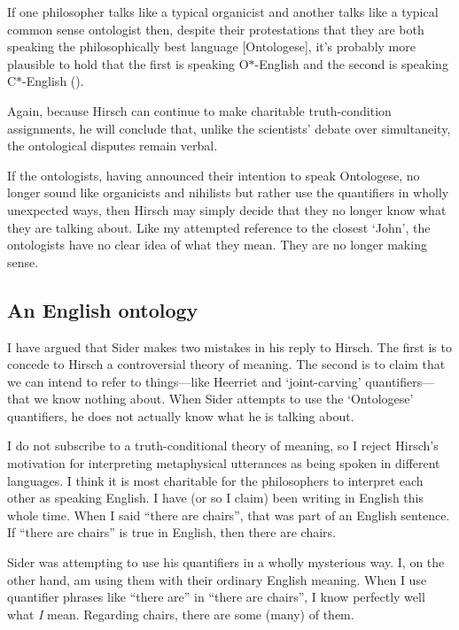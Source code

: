 \documentclass[11pt]{article}
\newenvironment{squote}{%
\begin{spacing}{1}
       	\begin{list}{}{%
\setlength{\labelwidth}{0pt}%
\rightmargin\leftmargin%
}
\item\relax
}{%
\end{list}%
\end{spacing}
}
\begin{document}
\begin{spacing}{1.25}
\begin{squote}
If one philosopher talks like a typical organicist and another talks
like a typical common sense ontologist then, despite their
protestations that they are both speaking the philosophically best
language [Ontologese], it's probably more plausible to hold that the
first is speaking O$\ast$-English and the second is speaking
C$\ast$-English (\citeyear[12]{hirsch2008}).
\end{squote}

Again, because Hirsch can continue to make charitable truth-condition
assignments, he will conclude that, unlike the scientists' debate over
simultaneity, the ontological disputes remain verbal.

If the ontologists, having announced their intention to speak
Ontologese, no longer sound like organicists and nihilists but rather
use the quantifiers in wholly unexpected ways, then Hirsch may simply
decide that they no longer know what they are talking about.  Like my
attempted reference to the closest `John', the ontologists have no
clear idea of what they mean.  They are no longer making sense.

\subsection{An English ontology}
I have argued that Sider makes two mistakes in his reply to Hirsch.
The first is to concede to Hirsch a controversial theory of meaning.
The second is to claim that we can intend to refer to things---like
Heerriet and `joint-carving' quantifiers---that we know nothing about.
 When Sider attempts to use the `Ontologese' quantifiers, he does not
 actually know what he is talking about.

I do not subscribe to a truth-conditional theory of meaning, so I
reject Hirsch's motivation for interpreting metaphysical utterances as
being spoken in different languages.  I think it is most charitable
for the philosophers to interpret each other as speaking English.  I
have (or so I claim) been writing in English this whole time.  When I
said ``there are chairs'', that was part of an English sentence.  If
``there are chairs'' is true in English, then there are chairs.

Sider was attempting to use his quantifiers in a wholly mysterious
way.  I, on the other hand, am using them with their ordinary English
meaning.  When I use quantifier phrases like ``there are'' in ``there
are chairs'', I know perfectly well what {\em I} mean.  Regarding
chairs, there are some (many) of them.


\end{spacing}
\end{document}
